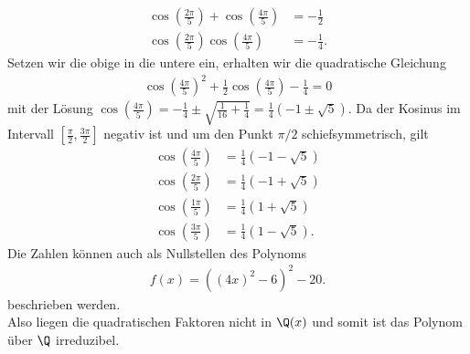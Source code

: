\begin{solution}
  \begin{align*}
    \cos\left(\frac{2\pi}{5}\right) + \cos\left(\frac{4\pi}{5}\right) &= -\frac{1}{2} \\
    \cos\left(\frac{2\pi}{5}\right)\cos\left(\frac{4\pi}{5}\right) &= -\frac{1}{4}.
  \end{align*}
  Setzen wir die obige in die untere ein, erhalten wir die quadratische Gleichung
  \begin{align*}
    \cos\left(\frac{4\pi}{5}\right)^2 + \frac{1}{2}\cos\left(\frac{4\pi}{5}\right) - \frac{1}{4} = 0
  \end{align*}
  mit der Lösung $\cos\left(\frac{4\pi}{5}\right) = -\frac{1}{4} \pm \sqrt{\frac{1}{16} + \frac{1}{4}} = \frac{1}{4}(-1\pm\sqrt{5})$.
  Da der Kosinus im Intervall $[\frac{\pi}{2},\frac{3\pi}{2}]$ negativ ist
  und um den Punkt $\pi/2$ schiefsymmetrisch, gilt
  \begin{align*}
    \cos\left(\frac{4\pi}{5}\right) &= \frac{1}{4}(-1-\sqrt{5}) \\
    \cos\left(\frac{2\pi}{5}\right) &= \frac{1}{4}(-1+\sqrt{5}) \\
    \cos\left(\frac{1\pi}{5}\right) &= \frac{1}{4}(1+\sqrt{5}) \\
    \cos\left(\frac{3\pi}{5}\right) &= \frac{1}{4}(1-\sqrt{5}).
  \end{align*}
  Die Zahlen können auch als Nullstellen des Polynoms
  \begin{align*}
    f(x) = ((4x)^2 - 6)^2 - 20.
  \end{align*}
  beschrieben werden. \\
  Also liegen die quadratischen Faktoren nicht in $\Q(x)$ und somit ist das Polynom über $\Q$ irreduzibel.

\end{solution}
